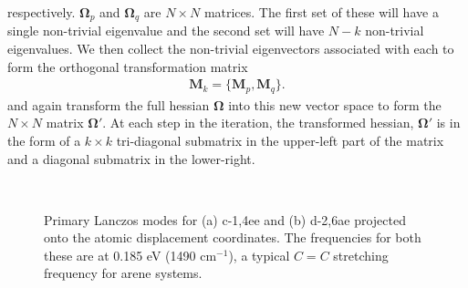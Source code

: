 respectively.  $\mathbf\Omega_{p} $ and $\mathbf\Omega_{q}$ are $N\times N$ matrices.
The first set of these  will have a single
non-trivial eigenvalue and the second set
will have $N-k$ non-trivial eigenvalues. We then collect the non-trivial eigenvectors associated with each
to form the orthogonal transformation matrix
\begin{eqnarray}
{\mathbf M}_{k} = \{{\mathbf M}_{p},{\mathbf M}_{q}\}.
\end{eqnarray}
and again transform the full hessian $\mathbf\Omega$ into this new vector space to form the $N\times N$ matrix $\mathbf\Omega'$.
 At each step in the iteration, the transformed hessian, $\mathbf\Omega'$ is in the form of a
$k\times k$ tri-diagonal submatrix in the upper-left part of the matrix and
a diagonal submatrix in the lower-right.


\begin{figure}[t]
\\
\caption{
Primary Lanczos modes for (a) c-1,4ee and (b) d-2,6ae projected onto the atomic displacement coordinates.  The frequencies
for both these are at 0.185 eV (1490 cm$^{-1}$), a typical $C=C$ stretching frequency for arene systems.
}\label{LanczosModes}
\end{figure}


